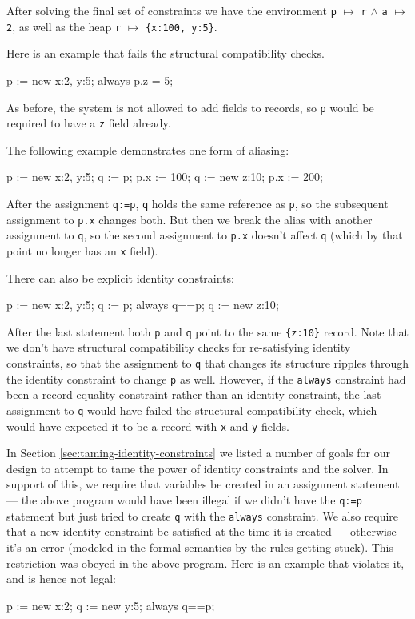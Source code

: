 \documentclass{article}
\begin{document}
After solving the final set of constraints we have the environment 
\verb|p| $\mapsto$ \verb|r| $\wedge$
\verb|a| $\mapsto$ \verb|2|, as well as the heap \verb|r| $\mapsto$
\verb|{x:100, y:5}|.

Here is an example that fails the structural compatibility checks.
\begin{example}
p := new {x:2, y:5};
always p.z = 5;
\end{example}

As before, the system is not allowed to add fields to records, so \verb|p|
would be required to have a \verb|z| field already.

The following example demonstrates one form of aliasing:
\begin{example}
p := new {x:2, y:5};
q := p;
p.x := 100;
q := new {z:10};
p.x := 200;
\end{example}

After the assignment \verb|q:=p|, \verb|q| holds the same reference as
\verb|p|, so the subsequent assignment to \verb|p.x| changes both.
But then we break the alias with another assignment to \verb|q|, so
the second assignment to \verb|p.x| doesn't affect \verb|q| (which by
that point no longer has an \verb|x| field).

There can also be explicit identity constraints:
\begin{example}
p := new {x:2, y:5};
q := p;
always q==p;
q := new {z:10};
\end{example}
After the last statement both \verb|p| and \verb|q| point to the same
\verb|{z:10}| record.  Note that we don't have structural
compatibility checks for re-satisfying identity constraints, so that
the assignment to \verb|q| that changes its structure ripples through
the identity constraint
to change \verb|p| as well.  However, if the \verb|always| constraint
had been a record equality constraint rather than an identity
constraint, the last assignment to \verb|q| would have failed the
structural compatibility check, which would have expected it to be a
record with \verb|x| and \verb|y| fields.

In Section \ref{sec:taming-identity-constraints} we listed a number of
goals for our design to attempt to tame the power of identity
constraints and the solver.  In support of this, we require that
variables be created in an assignment statement --- the above program
would have been illegal if we didn't have the \verb|q:=p| statement
but just tried to create \verb|q| with the \verb|always| constraint.
We also require that a new identity constraint be satisfied at the
time it is created --- otherwise it's an error (modeled in the formal
semantics by the rules getting stuck).  This restriction was obeyed in
the above program.  Here is an example that violates it, and is hence
not legal:
\begin{example}
p := new {x:2};
q := new {y:5};
always q==p;
\end{example}
\end{document}
